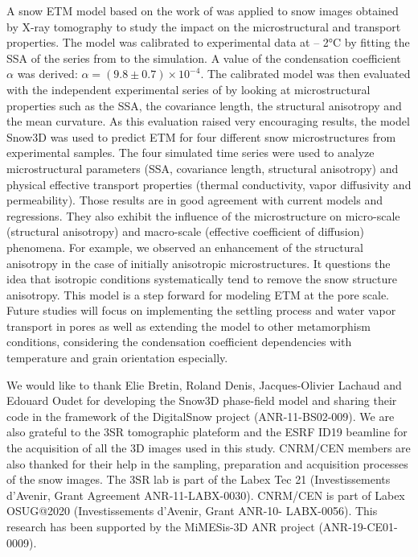 \documentclass[draft,ms]{agujournal2019}
\begin{document}
A snow ETM model based on the work of  was applied to snow images obtained by X-ray tomography to study the impact on the microstructural and transport properties. The model was calibrated to experimental data at – 2°C by fitting the SSA of the series from  to the simulation. A value of the condensation coefficient $\alpha$ was derived: $\alpha = ( 9.8 \pm 0.7)\times 10^{-4}$. The calibrated model was then evaluated with the independent experimental series of  by looking at microstructural properties such as the SSA, the covariance length, the structural anisotropy and the mean curvature. As this evaluation raised very encouraging results, the model Snow3D was used to predict ETM for four different snow microstructures from experimental samples. The four simulated time series were used to analyze microstructural parameters (SSA, covariance length, structural anisotropy) and physical effective transport properties (thermal conductivity, vapor diffusivity and permeability). Those results are in good agreement with current models and regressions. They also exhibit the influence of the microstructure on micro-scale (structural anisotropy) and macro-scale (effective coefficient of diffusion) phenomena. For example, we observed an enhancement of the structural anisotropy in the case of initially anisotropic microstructures. It questions the idea that isotropic conditions systematically tend to remove the snow structure anisotropy. This model is a step forward for modeling ETM at the pore scale. Future studies will focus on implementing the settling process and water vapor transport in pores as well as extending the model to other metamorphism conditions, considering the condensation coefficient dependencies with temperature and grain orientation especially.

\acknowledgments
We would like to thank Elie Bretin, Roland Denis, Jacques-Olivier Lachaud and Edouard Oudet for developing the Snow3D phase-field model and sharing their code in the framework of the DigitalSnow project (ANR-11-BS02-009). We are also grateful to the 3SR tomographic plateform and the ESRF ID19 beamline for the acquisition of all the 3D images used in this study. CNRM/CEN members are also thanked for their help in the sampling, preparation and acquisition processes of the snow images. The 3SR lab is part of the Labex Tec 21 (Investissements d’Avenir, Grant Agreement ANR-11-LABX-0030). CNRM/CEN is part of Labex OSUG@2020 (Investissements d’Avenir, Grant ANR-10- LABX-0056). This research has been supported by the MiMESis-3D ANR project (ANR-19-CE01-0009).


\end{document}
